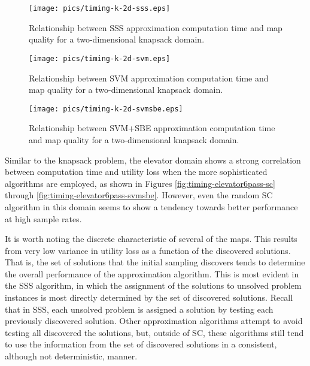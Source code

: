 \begin{figure}
\begin{center}
\texttt{[image: pics/timing-k-2d-sss.eps]}
\caption{Relationship between SSS approximation computation time and map quality for a two-dimensional knapsack domain.}
\label{fig:timing-k-2d-sss}
\end{center}
\end{figure}


\begin{figure}
\begin{center}
\texttt{[image: pics/timing-k-2d-svm.eps]}
\caption{Relationship between SVM approximation computation time and map quality for a two-dimensional knapsack domain.}
\label{fig:timing-k-2d-svm}
\end{center}
\end{figure}

\begin{figure}
\begin{center}
\texttt{[image: pics/timing-k-2d-svmsbe.eps]}
\caption{Relationship between SVM+SBE approximation computation time and map quality for a two-dimensional knapsack domain.}
\label{fig:timing-k-2d-svmsbe}
\end{center}
\end{figure}

Similar to the knapsack problem,  the elevator domain shows a strong correlation between computation time and utility loss when the more sophisticated algorithms are employed, as shown in Figures \ref{fig:timing-elevator6pass-sc} through \ref{fig:timing-elevator6pass-svmsbe}.  However, even the random SC algorithm in this domain seems to show a tendency towards better performance at high sample rates.


It is worth noting the discrete characteristic of several of the maps.  This results from very low variance in utility loss as a function of the discovered solutions.  That is, the set of solutions that the initial sampling discovers tends to determine the overall performance of the approximation algorithm.  This is most evident in the SSS algorithm, in which the assignment of the solutions to unsolved problem instances is most directly determined by the set of discovered solutions.  Recall that in SSS, each unsolved problem is assigned a solution by testing each previously discovered solution.  Other approximation algorithms attempt to avoid testing all discovered  the solutions, but, outside of SC, these algorithms still tend to use the information from the set of discovered solutions in a consistent, although not deterministic, manner.

